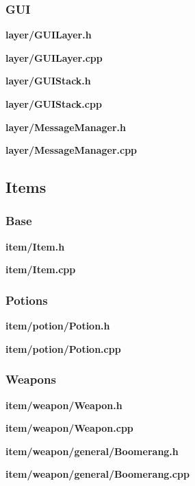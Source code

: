 \documentclass[../Main.tex]{subfiles}
\begin{document}
        \subsubsection{GUI}
            \textbf{layer/GUILayer.h}
            
            \textbf{layer/GUILayer.cpp}
            

            \textbf{layer/GUIStack.h}
            
            \textbf{layer/GUIStack.cpp}
            

            \textbf{layer/MessageManager.h}
            
            \textbf{layer/MessageManager.cpp}
            

    \subsection{Items}
        \subsubsection{Base}
            \textbf{item/Item.h}
            
            \textbf{item/Item.cpp}
            

        \subsubsection{Potions}
            \textbf{item/potion/Potion.h}
            
            \textbf{item/potion/Potion.cpp}
            

        \subsubsection{Weapons}
            \textbf{item/weapon/Weapon.h}
            
            \textbf{item/weapon/Weapon.cpp}
            

            \textbf{item/weapon/general/Boomerang.h}
            
            \textbf{item/weapon/general/Boomerang.cpp}
            
\end{document}
